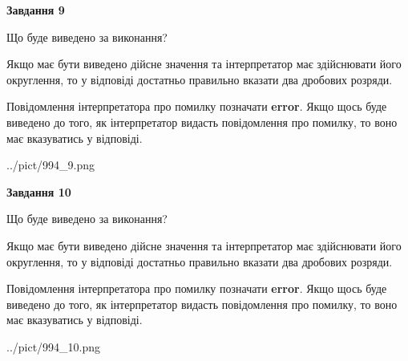 \documentclass[12pt, ukrainian]{article}
\begin{document}
{\begin {Large}
{\begin {center}\textbf{Завдання 9}\end {center}}\par
Що буде виведено за виконання? \par

Якщо має бути виведено дійсне значення та інтерпретатор має здійснювати його округлення, 
то у відповіді достатньо правильно вказати два дробових розряди.

Повідомлення інтерпретатора про помилку позначати \textbf{error}.
Якщо щось буде виведено до того, як інтерпретатор видасть повідомлення про помилку, 
то воно має вказуватись у відповіді. \par

\begin{center}
	{../pict/994_9.png}
\end{center}
\newpage

{\begin {center}\textbf{Завдання 10}\end {center}}\par
Що буде виведено за виконання? \par

Якщо має бути виведено дійсне значення та інтерпретатор має здійснювати його округлення, 
то у відповіді достатньо правильно вказати два дробових розряди.

Повідомлення інтерпретатора про помилку позначати \textbf{error}.
Якщо щось буде виведено до того, як інтерпретатор видасть повідомлення про помилку, 
то воно має вказуватись у відповіді. \par

\begin{center}
	{../pict/994_10.png}
\end{center}
\newpage

\end {Large}}
\end{document}
